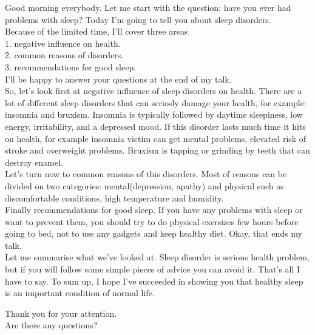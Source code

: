 \documentclass[a4paper,12pt]{article}
\begin{document}
Good morning everybody.
Let me start with the question: have you ever had problems with sleep?
Today I’m going to tell you about sleep disorders.\\

Because of the limited time, I’ll cover three areas\\
1. negative influence on health.\\
2. common reasons of disorders.\\
3. recommendations for good sleep.\\

I’ll be happy to answer your questions at the end of my talk.\\

So, let’s look first at negative influence of sleep disorders on health. There are a lot of different sleep disorders that can seriosly damage your health, for example: insomnia and bruxism.
Insomnia is typically followed by daytime sleepiness, low energy, irritability, and a depressed mood. If this disorder lasts much time it hits on health, for example insomnia victim can get mental problems, elevated risk of stroke and overweight problems. Bruxism is tapping or grinding by teeth that can destroy enamel.\\

Let’s turn now to common reasons of this disorders. Most of reasons can be divided on two categories: mental(depression, apathy) and physical such as discomfortable conditions, high temperature and humidity.\\

Finally recommendations for good sleep. If you have any problems with sleep or want to prevent them, you should try to do physical exersizes few hours before going to bed, not to use any gadgets and keep healthy diet.
Okay, that ends my talk.\\

Let me summarise what we've looked at.
Sleep disorder is serious health problem, but if you will follow some simple pieces of advice you can avoid it.
That’s all I have to say.
To sum up, I hope I’ve succeeded in showing you that healthy sleep is an important condition of normal life.

Thank you for your attention.\\

Are there any questions?\\
\end{document}
